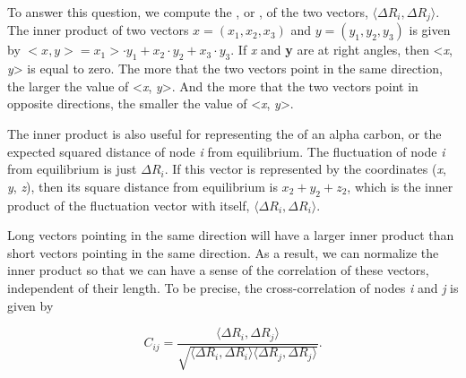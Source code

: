 To answer this question, we compute the , or , of the two vectors, $ \langle \Delta R_i, \Delta R_j \rangle $. The inner product of two vectors $x = (x_1, x_2, x_3)$ and $y = (y_1, y_2, y_3)$ is given by $<x, y> = x_1> · y_1 + x_2 · y_2 + x_3 · y_3$. If \textit{x} and \textbf{y} are at right angles, then <\textit{x}, \textit{y}> is equal to zero. The more that the two vectors point in the same direction, the larger the value of <\textit{x}, \textit{y}>. And the more that the two vectors point in opposite directions, the smaller the value of <\textit{x}, \textit{y}>.

\begin{qbox}[%
	Say that \textit{x} = (1, -2, 3), \textit{y} = (2, -3, 5), and \textbf{z} = (-1, 3, -4). Compute the inner products <\textit{x}, \textit{y}> and <\textit{x}, \textbf{z}> and ensure that your answers match the preceding observation.
	]\end{qbox}

The inner product is also useful for representing  the  of an alpha carbon, or the expected squared distance of node \textit{i} from equilibrium. The fluctuation of node \textit{i} from equilibrium is just $\Delta R_i$. If this vector is represented by the coordinates (\textit{x}, \textit{y}, \textit{z}), then its square distance from equilibrium is $x_2 + y_2 + z_2$, which is the inner product of the fluctuation vector with itself, $ \langle \Delta R_i, \Delta R_i \rangle $.

\begin{note}\end{note}

Long vectors pointing in the same direction will have a larger inner product than short vectors pointing in the same direction. As a result, we can normalize the inner product so that we can have a sense of the correlation of these vectors, independent of their length. To be precise, the cross-correlation of nodes \textit{i} and \textit{j} is given by

$$ C_{ij} = \dfrac{\langle \Delta R_i, \Delta R_j \rangle}{\sqrt{\langle \Delta R_i, \Delta R_i \rangle \langle \Delta R_j, \Delta R_j \rangle}}. $$

